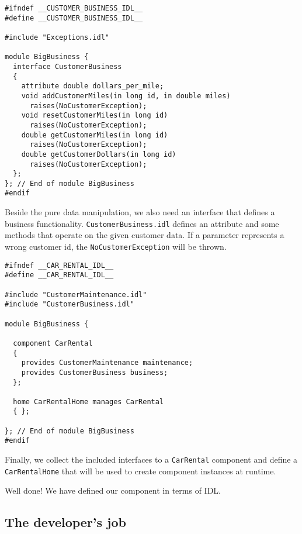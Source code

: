 \begin{small}
\begin{verbatim}
#ifndef __CUSTOMER_BUSINESS_IDL__
#define __CUSTOMER_BUSINESS_IDL__

#include "Exceptions.idl"

module BigBusiness {
  interface CustomerBusiness
  {
    attribute double dollars_per_mile;
    void addCustomerMiles(in long id, in double miles) 
      raises(NoCustomerException);
    void resetCustomerMiles(in long id) 
      raises(NoCustomerException);
    double getCustomerMiles(in long id) 
      raises(NoCustomerException);
    double getCustomerDollars(in long id) 
      raises(NoCustomerException);
  };
}; // End of module BigBusiness
#endif
\end{verbatim}
\end{small}

Beside the pure data manipulation, we also need an interface that defines a
business functionality.
{\tt CustomerBusiness.idl} defines an attribute and some methods that operate
on the given customer data. 
If a parameter represents a wrong customer id, the {\tt NoCustomerException}
will be thrown.

\begin{small}
\begin{verbatim}
#ifndef __CAR_RENTAL_IDL__
#define __CAR_RENTAL_IDL__

#include "CustomerMaintenance.idl"
#include "CustomerBusiness.idl"

module BigBusiness {

  component CarRental 
  { 
    provides CustomerMaintenance maintenance;
    provides CustomerBusiness business;
  };
  
  home CarRentalHome manages CarRental 
  { };

}; // End of module BigBusiness
#endif
\end{verbatim}
\end{small}

Finally, we collect the included interfaces to a {\tt CarRental} component and 
define a {\tt CarRentalHome} that will be used to create component instances at
runtime.

Well done! We have defined our component in terms of IDL.




\subsection{The developer's job}

